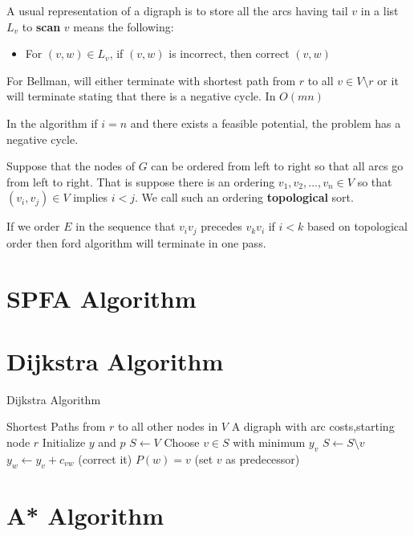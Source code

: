 			A usual representation of a digraph is to store all the arcs having tail $v$ in a list $L_v$ to \textbf{scan} $v$ means the following:
			\begin{itemize}
				\item For $(v, w) \in L_v$, if $(v, w)$ is incorrect, then correct $(v, w)$
			\end{itemize}

			For Bellman, will either terminate with shortest path from $r$ to all $v\in V\setminus r$ or it will terminate stating that there is a negative cycle. In $O(mn)$

			In the algorithm if $i = n$ and there exists a feasible potential, the problem has a negative cycle.

			Suppose that the nodes of $G$ can be ordered from left to right so that all arcs go from left to right. That is suppose there is an ordering $v_1, v_2, ..., v_n \in V$ so that $(v_i, v_j) \in V$ implies $i < j$. We call such an ordering \textbf{topological} sort.

			If we order $E$ in the sequence that $v_iv_j$ precedes $v_kv_i$ if $i<k$ based on topological order then ford algorithm will terminate in one pass.

		\section{SPFA Algorithm}

		\section{Dijkstra Algorithm}
			\begin{algorithm}
				\caption{Dijkstra Algorithm}
				\begin{algorithmic}
					\Ensure Shortest Paths from $r$ to all other nodes in $V$
					\Require A digraph with arc costs,starting node $r$
					\State Initialize $y$ and $p$
					\State $S \gets V$
						\State Choose $v \in S$ with minimum $y_v$
						\State $S \gets S\setminus v$
								\State $y_w \gets y_v + c_{vw}$ (correct it)
								\State $P(w) = v$ (set $v$ as predecessor)
							\EndIf
						\EndFor
					\EndWhile
				\end{algorithmic}
			\end{algorithm}

		\section{A* Algorithm}

